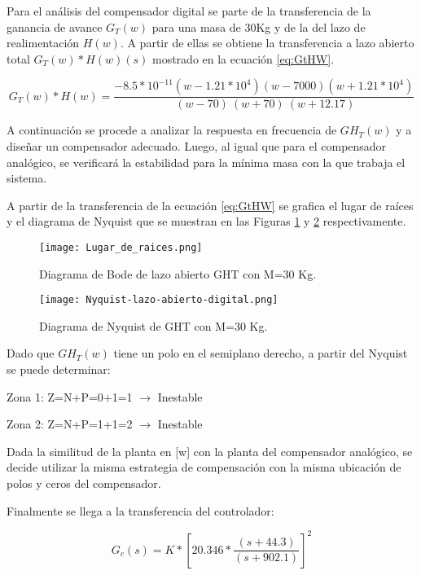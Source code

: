 \noindent Para el análisis del compensador digital se parte de la transferencia de la ganancia de avance $G_{T}(w)$ para una masa de 30Kg y de la del lazo de realimentación $H(w)$. A partir de ellas se obtiene la transferencia a lazo abierto total $G_{T}(w)*H(w)(s)$ mostrado en la ecuación \ref{eq:GtHW}.
 
\begin{equation}
	\label{eq:GtHW}  
	G_T(w)*H(w)=\frac{-8.5*10^{-11}(w-1.21*10^4)(w-7000)(w+1.21*10^4)}{\ (w-70)\ (w+70)\ (w+12.17)} 
\end{equation} 


\noindent A continuación se procede a analizar la respuesta en frecuencia de $GH_{T}(w)$ y a diseñar un compensador adecuado. Luego, al igual que para el compensador analógico, se verificará la estabilidad para la mínima masa  con la  que trabaja el sistema.

\noindent A partir de la transferencia de la ecuación  \ref{eq:GtHW} se  grafica el lugar de raíces y el diagrama de Nyquist que se muestran en las Figuras \ref{fig:lugar-de-raices} y \ref{fig:nyquist-lazo-abierto-digital} respectivamente.

\begin{figure}[H]
	\centering
	\texttt{[image: Lugar\_de\_raices.png]}
	\caption{Diagrama de Bode de lazo abierto GHT con M=30 Kg.}
	\label{fig:lugar-de-raices}
\end{figure}

\begin{figure}[H]
	\centering
	\texttt{[image: Nyquist-lazo-abierto-digital.png]}
	\caption{Diagrama de Nyquist de GHT con M=30 Kg.}
	\label{fig:nyquist-lazo-abierto-digital}
\end{figure}

\noindent Dado que ${GH}_{T}(w)$ tiene un polo en el semiplano derecho, a partir del Nyquist se puede determinar:

\noindent Zona 1: Z=N+P=0+1=1 $\mathrm{\to}$ Inestable 

\noindent Zona 2: Z=N+P=1+1=2 $\mathrm{\to}$ Inestable

\noindent Dada la similitud de la planta en [w] con la planta del compensador analógico, se decide utilizar la misma estrategia de compensación con la misma ubicación de polos y ceros del compensador.	

\noindent Finalmente se llega a la transferencia del controlador:


 \begin{equation}  
 	G_c(s)=K*{[20.346*\frac{(s+44.3)}{(s+902.1)}]}^2
 \end{equation} 
 


